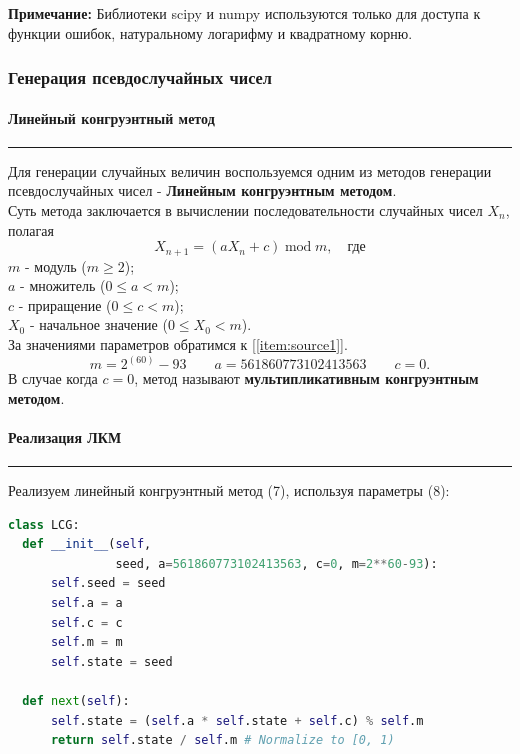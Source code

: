 \documentclass[a4paper, 14pt]{extarticle}
\begin{document}
{\footnotesize \textbf{Примечание:} Библиотеки scipy и numpy используются только 
для доступа к функции ошибок, натуральному логарифму и квадратному корню.}

\subsubsection{Генерация псевдослучайных чисел}

\paragraph{Линейный конгруэнтный метод}\vspace{-20pt}\rule{\linewidth}{0.1mm}

Для генерации случайных величин воспользуемся одним из методов генерации псевдослучайных чисел - 
\textbf{Линейным конгруэнтным методом}.\\
Суть метода заключается в вычислении последовательности случайных чисел $X_n$, полагая
\begin{equation}
  X_{n+1} = (aX_n + c)\hspace{3pt} \text{mod} \hspace{3pt} m, \quad \text{где}
\end{equation}
$m$ - модуль ($m \geq 2$); \\
$a$ - множитель ($0 \leq a < m$); \\
$c$ - приращение ($0 \leq c < m$); \\
$X_0$ - начальное значение ($0 \leq X_0 < m$).\\

За значениями параметров обратимся к [\ref{item:source1}].
\begin{equation}
  m = 2^{(60)} - 93 \qquad a = 561860773102413563 \qquad c = 0.
\end{equation}
В случае когда $c = 0$, метод называют \textbf{мультипликативным конгруэнтным методом}.

\paragraph{Реализация ЛКМ}\vspace{-20pt}\rule{\linewidth}{0.1mm}

Реализуем линейный конгруэнтный метод (7), используя параметры (8):\\

\begin{lstlisting}[language=Python, caption={Реализация ЛКМ}, label={lst:LCG}]
class LCG:
  def __init__(self, 
               seed, a=561860773102413563, c=0, m=2**60-93):
      self.seed = seed
      self.a = a
      self.c = c
      self.m = m
      self.state = seed

  def next(self):
      self.state = (self.a * self.state + self.c) % self.m
      return self.state / self.m # Normalize to [0, 1)
\end{lstlisting}
\end{document}
